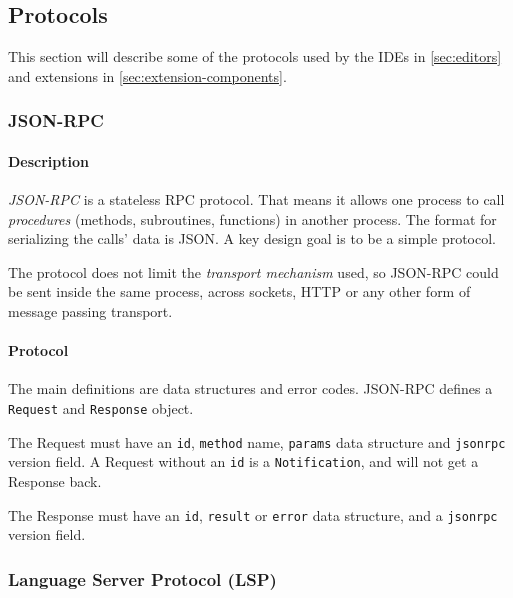 \subsection{Protocols}\label{sec:protocols}

This section will describe some of the protocols used by the \glspl{IDE} in \cref{sec:editors} and extensions in \cref{sec:extension-components}.

\subsubsection{JSON-RPC}

\paragraph*{Description}
\emph{JSON-RPC} is a stateless \acrfull{RPC} protocol.
That means it allows one process to call \emph{procedures} (methods, subroutines, functions) in another process.
The format for serializing the calls' data is \gls{JSON}.
A key design goal is to be a simple protocol.~\cite{json-rpcworkinggroupJSONRPCSpecification2010}

The protocol does not limit the \emph{transport mechanism} used, so \gls{JSON-RPC} could be sent inside the same process, across sockets, HTTP or any other form of message passing transport.~\cite{json-rpcworkinggroupJSONRPCSpecification2010}

\paragraph*{Protocol}
The main definitions are data structures and error codes.
\Gls{JSON-RPC} defines a \texttt{Request} and \texttt{Response} object.~\cite{json-rpcworkinggroupJSONRPCSpecification2010}

The Request must have an \texttt{id}, \texttt{method} name, \texttt{params} data structure and \texttt{jsonrpc} version field.
A Request without an \texttt{id} is a \texttt{Notification}, and will not get a Response back.~\cite{json-rpcworkinggroupJSONRPCSpecification2010}

The Response must have an \texttt{id}, \texttt{result} or \texttt{error} data structure, and a \texttt{jsonrpc} version field.~\cite{json-rpcworkinggroupJSONRPCSpecification2010}


\subsubsection{Language Server Protocol (LSP)}\label{sec:lsp}

